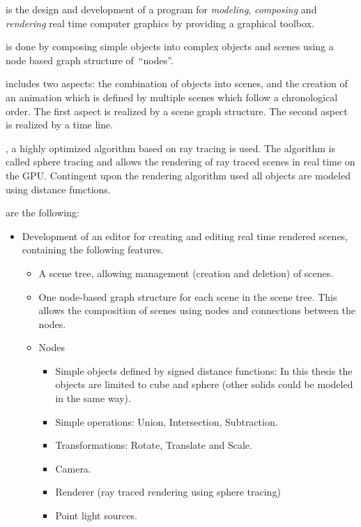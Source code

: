 \documentclass[%
    a4paper,    %
    justified,  %
    nobib,      %
    openany     %
]{tufte-book}
\begin{document}
 is the design and development of a
program for \textit{modeling}, \textit{composing} and \textit{rendering} real
time computer graphics by providing a graphical toolbox.

 is done by composing simple objects into complex objects
and scenes using a node based graph structure of~\enquote{nodes}.

 includes two aspects: the combination of objects into
scenes, and the creation of an animation which is defined by multiple scenes
which follow a chronological order. The first aspect is realized by a scene
graph structure. The second aspect is realized by a time line.

, a highly optimized algorithm based on ray tracing is
used. The algorithm is called sphere tracing and allows the rendering of ray
traced scenes in real time on the GPU. Contingent upon the rendering algorithm
used all objects are modeled using distance functions.

 are the following:
\begin{itemize}
  \item Development of an editor for creating and editing real time rendered
    scenes, containing the following features.
    \begin{itemize}
      \item A scene tree, allowing management (creation and deletion) of
        scenes.
      \item One node-based graph structure for each scene in the scene tree.
        This allows the composition of scenes using
        nodes and connections between the nodes.
    \item Nodes
      \begin{itemize}
        \item Simple objects defined by signed distance functions: In this
          thesis the objects are limited to cube and sphere (other solids could
          be modeled in the same way).
        \item Simple operations: Union, Intersection, Subtraction.
        \item Transformations: Rotate, Translate and Scale.
        \item Camera.
        \item Renderer (ray traced rendering using sphere tracing)
        \item Point light sources.
      \end{itemize}
    \end{itemize}
\end{itemize}
\end{document}

